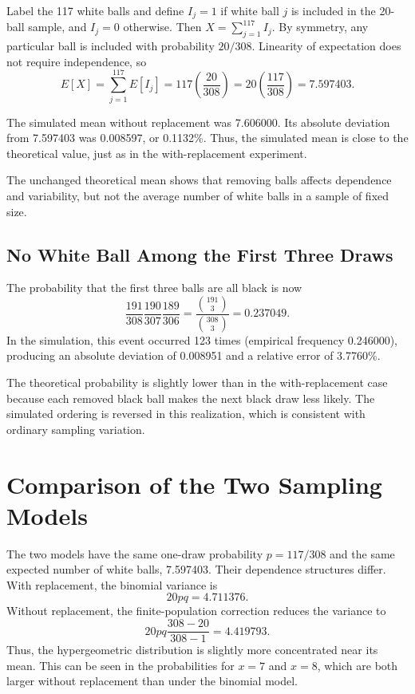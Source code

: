 \documentclass[12pt]{article}
\theoremstyle{definition}
\numberwithin{equation}{section}
\begin{document}
Label the 117 white balls and define \(I_j=1\) if white ball \(j\) is included in the 20-ball sample, and \(I_j=0\) otherwise. Then \(X=\sum_{j=1}^{117}I_j\). By symmetry, any particular ball is included with probability \(20/308\). Linearity of expectation does not require independence, so
\[
E[X]=\sum_{j=1}^{117}E[I_j]
=117\left(\frac{20}{308}\right)
=20\left(\frac{117}{308}\right)=7.597403.
\]

The simulated mean without replacement was 7.606000. Its absolute deviation from 7.597403 was 0.008597, or 0.1132\%. Thus, the simulated mean is close to the theoretical value, just as in the with-replacement experiment.

The unchanged theoretical mean shows that removing balls affects dependence and variability, but not the average number of white balls in a sample of fixed size.

\subsection{No White Ball Among the First Three Draws}

The probability that the first three balls are all black is now
\[
\frac{191}{308}\frac{190}{307}\frac{189}{306}
=\frac{\binom{191}{3}}{\binom{308}{3}}
=0.237049.
\]
In the simulation, this event occurred 123 times (empirical frequency 0.246000), producing an absolute deviation of 0.008951 and a relative error of 3.7760\%.

The theoretical probability is slightly lower than in the with-replacement case because each removed black ball makes the next black draw less likely. The simulated ordering is reversed in this realization, which is consistent with ordinary sampling variation.

\vfill\pagebreak

\section{Comparison of the Two Sampling Models}

The two models have the same one-draw probability \(p=117/308\) and the same expected number of white balls, 7.597403. Their dependence structures differ. With replacement, the binomial variance is
\[
20pq=4.711376.
\]
Without replacement, the finite-population correction reduces the variance to
\[
20pq\frac{308-20}{308-1}=4.419793.
\]
Thus, the hypergeometric distribution is slightly more concentrated near its mean. This can be seen in the probabilities for \(x=7\) and \(x=8\), which are both larger without replacement than under the binomial model.
\end{document}
